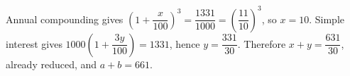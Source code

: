 Annual compounding gives $(1+\dfrac{x}{100})^3=\dfrac{1331}{1000}=(\dfrac{11}{10})^3$, so $x=10$. Simple interest gives $1000(1+\dfrac{3y}{100})=1331$, hence $y=\dfrac{331}{30}$. Therefore $x+y=\dfrac{631}{30}$, already reduced, and $\boxed{a+b=661}$.
